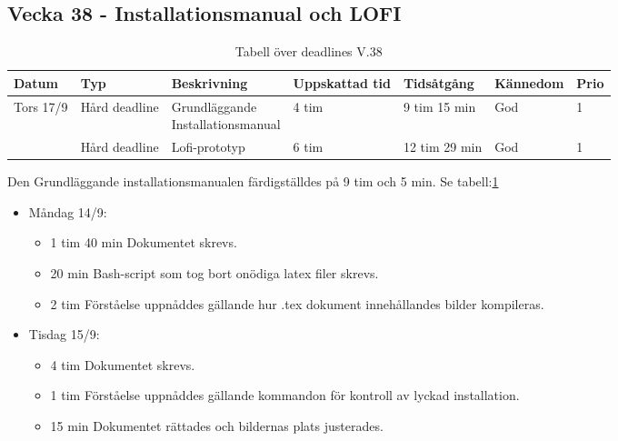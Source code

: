 \documentclass{TDP003mall}
\begin{document}
\subsection*{Vecka 38 - Installationsmanual och LOFI}
\begin{table}[h!]
\begin{tabularx}{\linewidth}{|l|l|l|l|l|l|l|}
  \hline
  Datum     & Typ           & Beskrivning                                        & Uppskattad tid & Tidsåtgång    & Kännedom & Prio\\
  \hline                                                    
  Tors 17/9 & Hård deadline & \makecell[tl]{Grundläggande \\Installationsmanual} & 4 tim          & 9 tim 15 min  & God      & 1\\
  \hline                                                    
            & Hård deadline & Lofi-prototyp                                      & 6 tim          & 12 tim 29 min & God      & 1\\
  \hline
\end{tabularx}
\caption{Tabell över deadlines V.38\label{tab:3}}
   \label{tab:3}
  \end{table}

Den Grundläggande installationsmanualen färdigställdes på 9 tim och 5 min. Se tabell:\ref{tab:3}
\begin{itemize}
  \item Måndag 14/9:
  \begin{itemize}
    \item 1 tim 40 min Dokumentet skrevs.
    \item 20 min Bash-script som tog bort onödiga latex filer skrevs.
    \item 2 tim Förståelse uppnåddes gällande hur .tex dokument innehållandes bilder kompileras.
  \end{itemize}
  \item Tisdag 15/9:
  \begin{itemize}
    \item 4 tim Dokumentet skrevs.
    \item 1 tim Förståelse uppnåddes gällande kommandon för kontroll av lyckad installation.
    \item 15 min Dokumentet rättades och bildernas plats justerades.
  \end{itemize}
\end{itemize}
\end{document}
